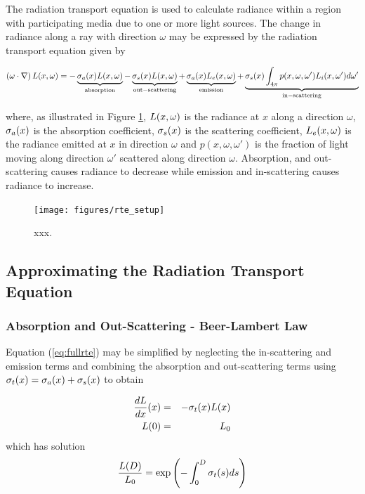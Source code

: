 The radiation transport equation is used to calculate radiance
within a region with participating media due to one or more light
sources. The change in radiance along a ray with direction
$\omega$ may be expressed by the radiation transport equation
given by

\begin{eqnarray}
\label{eq:fullrte}
 \left(\omega\cdot\nabla\right)L(x,\omega) =
-\underbrace{\sigma_a(x)L(x,\omega)}_\mathrm{absorption}-\underbrace{\sigma_s(x)L(x,\omega)}_\mathrm{out-scattering}
+ \underbrace{\sigma_a(x)L_e(x,\omega)}_\mathrm{emission} +
\underbrace{\sigma_s(x)\int_{4\pi}p(x,\omega,\omega')L_i(x,\omega')d\omega'}_\mathrm{in-scattering}
\end{eqnarray}

\noindent where, as illustrated in Figure \ref{figRadiance},
$L(x,\omega)$ is the radiance at $x$ along a direction $\omega$, $\sigma_a(x)$
is the absorption coefficient, $\sigma_s(x)$ is the scattering
coefficient, $L_e(x,\omega)$ is the radiance emitted at $x$ in direction
$\omega$ and $p(x,\omega,\omega')$ is the fraction of light moving
along direction $\omega'$ scattered along direction $\omega$.
Absorption, and out-scattering causes radiance to decrease while
emission and in-scattering causes radiance to increase.
\begin{figure}[\figoptions]
\begin{center}
\texttt{[image: figures/rte\_setup]}
\end{center}
\caption{xxx.} \label{figRadiance}
\end{figure}

\subsection{Approximating the Radiation Transport Equation}
\subsubsection{Absorption and Out-Scattering - Beer-Lambert Law}
Equation (\ref{eq:fullrte}) may be simplified by neglecting the
in-scattering and emission terms and combining the absorption and
out-scattering terms using $\sigma_t(x)=\sigma_a(x)+\sigma_s(x)$ to obtain

\begin{eqnarray*}
\frac{dL}{dx}(x)&=&-\sigma_t(x) L(x)\\
L(0)&=&L_0
\end{eqnarray*}
which has solution
\begin{equation}
\label{eq:beer1} \frac{L(D)}{L_0}=\exp\left({-\int_0^D \sigma_t(s) ds}\right)
\end{equation}


